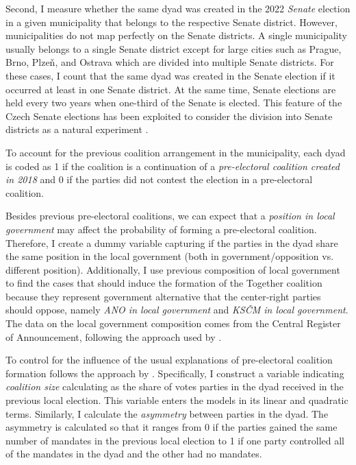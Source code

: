 \documentclass[]{interact}
\theoremstyle{plain}%
\theoremstyle{definition}
\theoremstyle{remark}
\begin{document}
Second, I measure whether the same dyad was created in the 2022 \emph{Senate} election in a given municipality that belongs to the respective Senate district. However, municipalities do not map perfectly on the Senate districts. A single municipality usually belongs to a single Senate district except for large cities such as Prague, Brno, Plzeň, and Ostrava which are divided into multiple Senate districts. For these cases, I count that the same dyad was created in the Senate election if it occurred at least in one Senate district. At the same time, Senate elections are held every two years when one-third of the Senate is elected. This feature of the Czech Senate elections has been exploited to consider the division into Senate districts as a natural experiment \citep[cf.][]{roberts2018,lysek2022}. 

To account for the previous coalition arrangement in the municipality, each dyad is coded as 1 if the coalition is a continuation of a \emph{pre-electoral coalition created in 2018} and 0 if the parties did not contest the election in a pre-electoral coalition. 

Besides previous pre-electoral coalitions, we can expect that a \emph{position in local government} may affect the probability of forming a pre-electoral coalition. Therefore, I create a dummy variable capturing if the parties in the dyad share the same position in the local government (both in government/opposition vs. different position). Additionally, I use previous composition of local government to find the cases that should induce the formation of the Together coalition because they represent government alternative that the center-right parties should oppose, namely \emph{ANO in local government} and \emph{KSČM in local government}. 
The data on the local government composition comes from the Central Register of Announcement, following the approach used by \citet{skvrnak2021}.

To control for the influence of the usual explanations of pre-electoral coalition formation follows the approach by \citet{golder2006}. Specifically, I construct a variable indicating \emph{coalition size} calculating as the share of votes parties in the dyad received in the previous local election. This variable enters the models in its linear and quadratic terms.
Similarly, I calculate the \emph{asymmetry} between parties in the dyad. The asymmetry is calculated so that it ranges from 0 if the parties gained the same number of mandates in the previous local election to 1 if one party controlled all of the mandates in the dyad and the other had no mandates.
\end{document}
